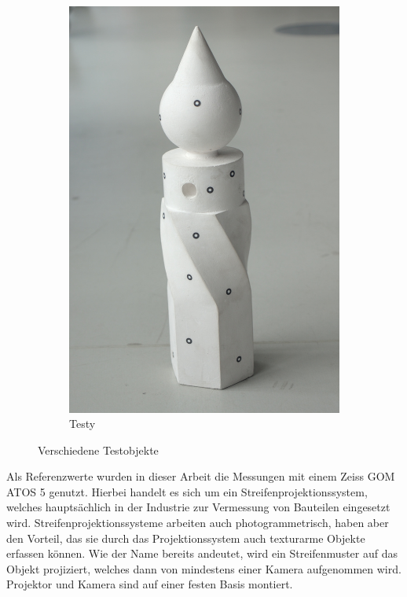 \documentclass[./00PhotoBox.tex]{subfiles}
\begin{document}
\begin{figure}
\begin{subfigure}{0.32\textwidth}
        \includegraphics[width=1\textwidth]{img/7_versuche/bild_testy.jpg}
        \caption{Testy}
        \label{img:bild_testy}
    \end{subfigure}
    \caption{Verschiedene Testobjekte}
    \label{img:bilder_testobjekte}
\end{figure}

Als Referenzwerte wurden in dieser Arbeit die Messungen mit einem Zeiss GOM ATOS 5 genutzt. Hierbei handelt es sich um ein Streifenprojektionssystem, welches hauptsächlich in der Industrie zur Vermessung von Bauteilen eingesetzt wird. Streifenprojektionssysteme arbeiten auch photogrammetrisch, haben aber den Vorteil, das sie durch das Projektionssystem auch texturarme Objekte erfassen können. Wie der Name bereits andeutet, wird ein Streifenmuster auf das Objekt projiziert, welches dann von mindestens einer Kamera aufgenommen wird. Projektor und Kamera sind auf einer festen Basis montiert. \citep[S. 581f]{luhmann}
\end{document}
